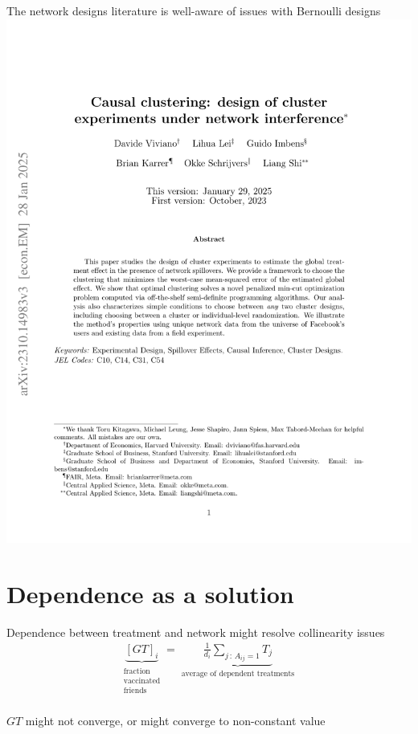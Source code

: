 \documentclass[aspectratio=169]{beamer}
\theoremstyle{remark}
\begin{document}
\begin{frame}{The network designs literature is well-aware of issues with Bernoulli designs}
    \vfill
    \centering
    \includegraphics[height=0.95\textheight, page=1, trim={1.5cm 9cm 0 3.5cm}, clip]{./papers/viviano-clustering.pdf}
\end{frame}

\section{Dependence as a solution}

\begin{frame}{Dependence between treatment and network might resolve collinearity issues}
    \Large
    \begin{align*}
        \underbrace{[GT]_i}_{\substack{\text{fraction} \\ \text{vaccinated} \\ \text{friends}}}
        = \underbrace{
            \frac{1}{d_i} \sum_{j \, : \, A_{ij} = 1} T_j
        }_{\substack{\text{average of dependent treatments}}}
    \end{align*} \\
    \normalsize
    \centering
    \vspace{8mm}
    $GT$ might not converge, or might converge to non-constant value
\end{frame}
\end{document}
